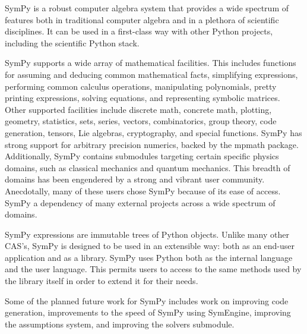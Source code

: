 SymPy is a robust computer algebra system that provides a wide spectrum of
features both in traditional computer algebra and in a plethora of scientific
disciplines. It can be used in a first-class way with other
Python projects, including the scientific Python stack.


SymPy supports a wide array of mathematical facilities. This includes
functions for assuming and deducing common mathematical facts,
simplifying expressions, performing common calculus operations, manipulating polynomials, pretty printing
expressions, solving equations, and representing symbolic matrices. Other supported
facilities
include discrete math, concrete math, plotting, geometry, statistics,
sets, series, vectors, combinatorics, group theory, code
generation, tensors, Lie algebras, cryptography, and special functions.
SymPy has strong support for arbitrary precision numerics, backed by the
mpmath package. Additionally, SymPy contains submodules targeting certain specific physics domains,
such as classical mechanics and quantum mechanics.  This breadth of domains has
been engendered by a strong and vibrant user community.
Anecdotally, many of these users chose SymPy because of its ease of access.
SymPy a dependency of many external projects across a wide
spectrum of domains.

SymPy expressions are immutable trees of Python objects. Unlike many other
CAS's, SymPy is designed to be used in an extensible way: both as an end-user
application and as a library. SymPy uses Python both as the internal language
and the user language. This permits users to access to the same methods used
by the library itself in order to extend it for their needs.


Some of the planned future work for SymPy includes work on improving code
generation, improvements to the speed of SymPy using SymEngine, improving the
assumptions system, and improving the solvers submodule.


